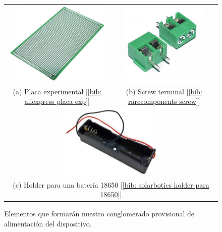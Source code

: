 \documentclass[12pt]{article}
\begin{document}
	\pagebreak
	
	\begin{figure}[h!]
		\begin{center}
			\begin{tabular}{cc}
				\includegraphics[width=50mm]{img/placa_exp.png} \label{Ejemplo placa experimental} &   \includegraphics[width=40mm]{img/screw.jpg}  \label{Ejemplo screw} \\
				(a) Placa experimental [\ref{bib: aliexpress placa exp}] & (b) Screw terminal [\ref{bib: rarecomponents screw}] \\[6pt]
				\multicolumn{2}{c}{\includegraphics[width=50mm]{img/18650_holder.png} \label{Ejemplo holder 18650} }\\
				\multicolumn{2}{c}{(c) Holder para una batería 18650 [\ref{bib: solarbotics holder para 18650}]}
			\end{tabular}
			\caption{Elementos que formarán nuestro conglomerado provisional de alimentación del dispositivo.}
			\label{Componentes conglomerado}
		\end{center}
	\end{figure}
\end{document}
